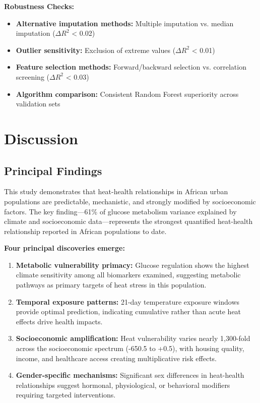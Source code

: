 \documentclass[11pt,a4paper]{article}
\begin{document}
\textbf{Robustness Checks:}
\begin{itemize}
\item \textbf{Alternative imputation methods:} Multiple imputation vs. median imputation ($\Delta$$R^2$ < 0.02)
\item \textbf{Outlier sensitivity:} Exclusion of extreme values ($\Delta$$R^2$ < 0.01)  
\item \textbf{Feature selection methods:} Forward/backward selection vs. correlation screening ($\Delta$$R^2$ < 0.03)
\item \textbf{Algorithm comparison:} Consistent Random Forest superiority across validation sets
\end{itemize}

\section{Discussion}

\subsection{Principal Findings}

This study demonstrates that heat-health relationships in African urban populations are predictable, mechanistic, and strongly modified by socioeconomic factors. The key finding—61\% of glucose metabolism variance explained by climate and socioeconomic data—represents the strongest quantified heat-health relationship reported in African populations to date.

\textbf{Four principal discoveries emerge:}

\begin{enumerate}
\item \textbf{Metabolic vulnerability primacy:} Glucose regulation shows the highest climate sensitivity among all biomarkers examined, suggesting metabolic pathways as primary targets of heat stress in this population.

\item \textbf{Temporal exposure patterns:} 21-day temperature exposure windows provide optimal prediction, indicating cumulative rather than acute heat effects drive health impacts.

\item \textbf{Socioeconomic amplification:} Heat vulnerability varies nearly 1,300-fold across the socioeconomic spectrum (-650.5 to +0.5), with housing quality, income, and healthcare access creating multiplicative risk effects.

\item \textbf{Gender-specific mechanisms:} Significant sex differences in heat-health relationships suggest hormonal, physiological, or behavioral modifiers requiring targeted interventions.
\end{enumerate}
\end{document}
